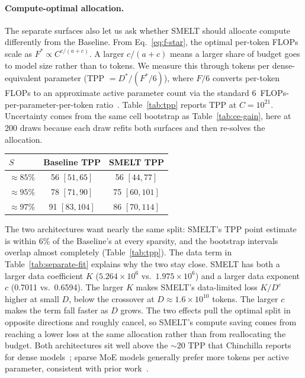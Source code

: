 \documentclass[]{bytedance_seed}
\newcommand{\archname}{SMELT}
\theoremstyle{definition}
\theoremstyle{remark}
\begin{document}
\paragraph{Compute-optimal allocation.}
%
The separate surfaces also let us ask whether \archname{} should allocate compute differently from the Baseline.
%
From Eq.~\ref{eq:f-star}, the optimal per-token FLOPs scale as $F^{*} \propto C^{c/(a+c)}$.
%
A larger $c/(a+c)$ means a larger share of budget goes to model size rather than to tokens.
%
We measure this through tokens per dense-equivalent parameter (TPP $= D^{*} / (F^{*}/6)$), where $F/6$ converts per-token FLOPs to an approximate active parameter count via the standard $6$~FLOPs-per-parameter-per-token ratio~\cite{kaplan2020scaling}.
%
Table~\ref{tab:tpp} reports TPP at $C = 10^{21}$.
%
Uncertainty comes from the same cell bootstrap as Table~\ref{tab:ce-gain}, here at 200 draws because each draw refits both surfaces and then re-solves the allocation.
%

\begin{center}
\small
{}
\label{tab:tpp}
\begin{tabular}{lcc}
\toprule
$S$ & Baseline TPP & \archname{} TPP \\
\midrule
$\approx85\%$ & 56 $[51, 65]$ & 56 $[44, 77]$ \\
$\approx95\%$ & 78 $[71, 90]$ & 75 $[60, 101]$ \\
$\approx97\%$ & 91 $[83, 104]$ & 86 $[70, 114]$ \\
\bottomrule
\end{tabular}
\end{center}

The two architectures want nearly the same split: \archname{}'s TPP point estimate is within 6\% of the Baseline's at every sparsity, and the bootstrap intervals overlap almost completely (Table~\ref{tab:tpp}).
%
The data term in Table~\ref{tab:separate-fit} explains why the two stay close.
%
\archname{} has both a larger data coefficient $K$ ($5.264 \times 10^{6}$ vs.\ $1.975 \times 10^{6}$) and a larger data exponent $c$ (0.7011 vs.\ 0.6594).
%
The larger $K$ makes \archname{}'s data-limited loss $K/D^c$ higher at small
$D$, below the crossover at $D \approx 1.6 \times 10^{10}$ tokens.
%
The larger $c$ makes the term fall faster as $D$ grows.
%
The two effects pull the optimal split in opposite directions and roughly cancel, so \archname{}'s compute saving comes from reaching a lower loss at the same allocation rather than from reallocating the budget.
%
Both architectures sit well above the ${\sim}20$ TPP that Chinchilla reports for dense models~\cite{hoffmann2022training}; sparse MoE models generally prefer more tokens per active parameter, consistent with prior work~\cite{abnar2025parameters}.
%
\end{document}
